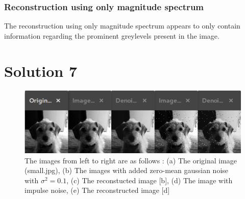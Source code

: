 \documentclass[a4paper,fleqn,11pt]{article}
\theoremstyle{mytheor}
\begin{document}
\subsubsection*{Reconstruction using only magnitude spectrum}
The reconstruction using only magnitude spectrum appears to only contain information regarding the prominent greylevels present in the image.

\section*{Solution 7}
\begin{figure}[h]
\includegraphics[scale=1.0]{../results/Q7_sigma01.png}
\caption{The images from left to right are as follows : (a) The original image (small.jpg), (b) The images with added zero-mean gaussian noise with $\sigma^2 = 0.1$, (c) The reconstucted image [b], (d) The image with impulse noise, (e) The reconstructed image [d]}
\end{figure}
\end{document}
